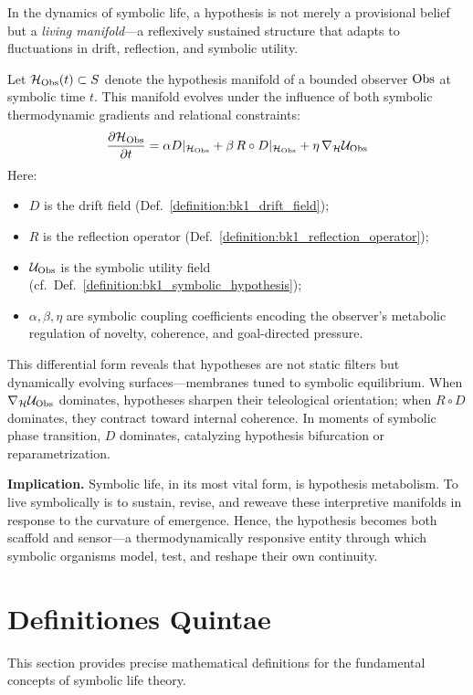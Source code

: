 \begin{scholium} \label{scholium:bk5_hypotheses_as_adaptive_sym}
In the dynamics of symbolic life, a hypothesis is not merely a provisional belief but a \emph{living manifold}—a reflexively sustained structure that adapts to fluctuations in drift, reflection, and symbolic utility.

Let $\mathcal{H}_{\mathrm{Obs}}(t) \subset S$ denote the hypothesis manifold of a bounded observer $\mathrm{Obs}$ at symbolic time $t$. This manifold evolves under the influence of both symbolic thermodynamic gradients and relational constraints:
\begin{equation}
\frac{\partial \mathcal{H}_{\mathrm{Obs}}}{\partial t} = \alpha D|_{\mathcal{H}_{\mathrm{Obs}}} + \beta \, R \circ D|_{\mathcal{H}_{\mathrm{Obs}}} + \eta \, \nabla_{\mathcal{H}} \mathcal{U}_{\mathrm{Obs}}
\end{equation}
Here:
\begin{itemize}
    \item $D$ is the drift field (Def.~\ref{definition:bk1_drift_field});
    \item $R$ is the reflection operator (Def.~\ref{definition:bk1_reflection_operator});
    \item $\mathcal{U}_{\mathrm{Obs}}$ is the symbolic utility field (cf.~Def.~\ref{definition:bk1_symbolic_hypothesis});
    \item $\alpha, \beta, \eta$ are symbolic coupling coefficients encoding the observer’s metabolic regulation of novelty, coherence, and goal-directed pressure.
\end{itemize}

This differential form reveals that hypotheses are not static filters but dynamically evolving surfaces—membranes tuned to symbolic equilibrium. When $\nabla_{\mathcal{H}} \mathcal{U}_{\mathrm{Obs}}$ dominates, hypotheses sharpen their teleological orientation; when $R \circ D$ dominates, they contract toward internal coherence. In moments of symbolic phase transition, $D$ dominates, catalyzing hypothesis bifurcation or reparametrization.

\textbf{Implication.} Symbolic life, in its most vital form, is hypothesis metabolism. To live symbolically is to sustain, revise, and reweave these interpretive manifolds in response to the curvature of emergence. Hence, the hypothesis becomes both scaffold and sensor—a thermodynamically responsive entity through which symbolic organisms model, test, and reshape their own continuity.
\end{scholium}
\section{Definitiones Quintae}
\label{sec:bk5_definitiones_quintae}
This section provides precise mathematical definitions for the fundamental concepts of symbolic life theory.

